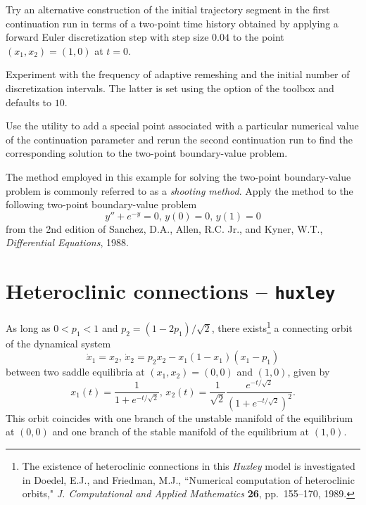 \begin{exercises}
\item Try an alternative construction of the initial trajectory segment in the first continuation run in terms of a two-point time history obtained by applying a forward Euler discretization step with step size $0.04$ to the point $(x_1,x_2)=(1,0)$ at $t=0$.

\item Experiment with the frequency of adaptive remeshing and the initial number of discretization intervals. The latter is set using the  option of the  toolbox and defaults to $10$.

\item Use the  utility to add a special point associated with a particular numerical value of the continuation parameter  and rerun the second continuation run to find the corresponding solution to the two-point boundary-value problem.

\item The method employed in this example for solving the two-point boundary-value problem is commonly referred to as a \emph{shooting method}. Apply the method to the following two-point boundary-value problem
\[
y''+e^{-y}=0,\,y(0)=0,\,y(1)=0
\]
from the 2nd edition of Sanchez, D.A., Allen, R.C. Jr., and Kyner, W.T., \emph{Differential Equations}, 1988. 
\end{exercises}

\section{Heteroclinic connections -- \texttt{huxley}}
As long as $0<p_1<1$ and $p_2=(1-2p_1)/\sqrt{2}$, there exists\footnote{The existence of heteroclinic connections in this \emph{Huxley} model is investigated in Doedel, E.J., and Friedman, M.J., ``Numerical computation of heteroclinic orbits," \emph{J. Computational and Applied Mathematics} \textbf{26}, pp.~155--170, 1989.} a connecting orbit of the dynamical system
\begin{equation}
\dot{x}_1=x_2,\,\dot{x}_2=p_2 x_2-x_1(1-x_1)(x_1-p_1)
\end{equation}
between two saddle equilibria at $(x_1,x_2)=(0,0)$ and $(1,0)$, given by
\begin{equation}
x_1(t)=\frac{1}{1+e^{-t/\sqrt{2}}},\,x_2(t)=\frac{1}{\sqrt{2}}\frac{e^{-t/\sqrt{2}}}{(1+e^{-t/\sqrt{2}})^2}.
\end{equation}
This orbit coincides with one branch of the unstable manifold of the equilibrium at $(0,0)$ and one branch of the stable manifold of the equilibrium at $(1,0)$.

